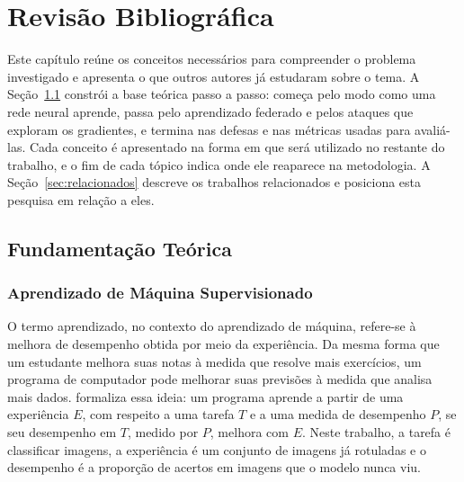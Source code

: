 \chapter{Revisão Bibliográfica} \label{RevisaoBibliografica}


Este capítulo reúne os conceitos necessários para compreender o problema investigado e apresenta o que outros autores já estudaram sobre o tema. A Seção~\ref{sec:fundamentacao} constrói a base teórica passo a passo: começa pelo modo como uma rede neural aprende, passa pelo aprendizado federado e pelos ataques que exploram os gradientes, e termina nas defesas e nas métricas usadas para avaliá-las. Cada conceito é apresentado na forma em que será utilizado no restante do trabalho, e o fim de cada tópico indica onde ele reaparece na metodologia. A Seção~\ref{sec:relacionados} descreve os trabalhos relacionados e posiciona esta pesquisa em relação a eles.

\section{Fundamentação Teórica} \label{sec:fundamentacao}

\subsection{Aprendizado de Máquina Supervisionado}

O termo aprendizado, no contexto do aprendizado de máquina, refere-se à melhora de desempenho obtida por meio da experiência. Da mesma forma que um estudante melhora suas notas à medida que resolve mais exercícios, um programa de computador pode melhorar suas previsões à medida que analisa mais dados.  formaliza essa ideia: um programa aprende a partir de uma experiência $E$, com respeito a uma tarefa $T$ e a uma medida de desempenho $P$, se seu desempenho em $T$, medido por $P$, melhora com $E$. Neste trabalho, a tarefa é classificar imagens, a experiência é um conjunto de imagens já rotuladas e o desempenho é a proporção de acertos em imagens que o modelo nunca viu.

